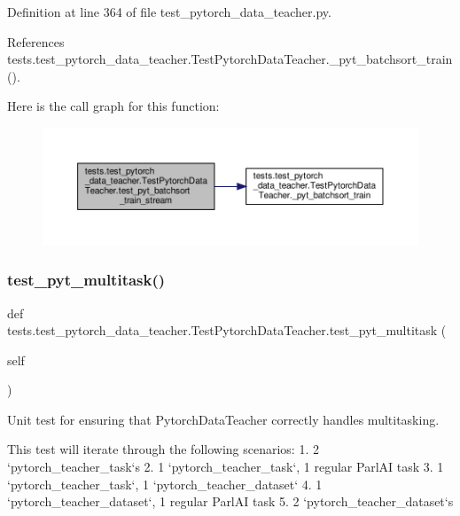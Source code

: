 Definition at line 364 of file test\+\_\+pytorch\+\_\+data\+\_\+teacher.\+py.



References tests.\+test\+\_\+pytorch\+\_\+data\+\_\+teacher.\+Test\+Pytorch\+Data\+Teacher.\+\_\+pyt\+\_\+batchsort\+\_\+train().

Here is the call graph for this function\+:
\nopagebreak
\begin{figure}[H]
\begin{center}
\leavevmode
\includegraphics[width=350pt]{classtests_1_1test__pytorch__data__teacher_1_1TestPytorchDataTeacher_a5db5cdee08adaaf60c646c7c884f1068_cgraph}
\end{center}
\end{figure}
\mbox{\label{classtests_1_1test__pytorch__data__teacher_1_1TestPytorchDataTeacher_a7337dfde736431a6c52de772c5230617}} 
\subsubsection{\texorpdfstring{test\+\_\+pyt\+\_\+multitask()}{test\_pyt\_multitask()}}
{\footnotesize\ttfamily def tests.\+test\+\_\+pytorch\+\_\+data\+\_\+teacher.\+Test\+Pytorch\+Data\+Teacher.\+test\+\_\+pyt\+\_\+multitask (\begin{DoxyParamCaption}\item[{}]{self }\end{DoxyParamCaption})}

\begin{DoxyVerb}Unit test for ensuring that PytorchDataTeacher correctly handles
multitasking.

This test will iterate through the following scenarios:
    1. 2 `pytorch_teacher_task`s
    2. 1 `pytorch_teacher_task`, 1 regular ParlAI task
    3. 1 `pytorch_teacher_task`, 1 `pytorch_teacher_dataset`
    4. 1 `pytorch_teacher_dataset`, 1 regular ParlAI task
    5. 2 `pytorch_teacher_dataset`s\end{DoxyVerb}
 

